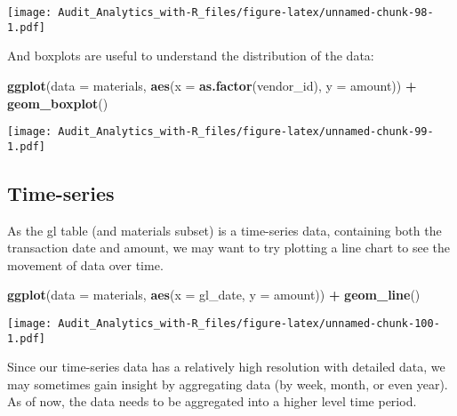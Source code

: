 \documentclass[
]{book}
\newenvironment{Shaded}{\begin{snugshade}}{\end{snugshade}}
\newcommand{\CommentTok}[1]{\textcolor[rgb]{0.56,0.35,0.01}{\textit{#1}}}
\newcommand{\DataTypeTok}[1]{\textcolor[rgb]{0.13,0.29,0.53}{#1}}
\newcommand{\KeywordTok}[1]{\textcolor[rgb]{0.13,0.29,0.53}{\textbf{#1}}}
\newcommand{\NormalTok}[1]{#1}
\newcommand{\OperatorTok}[1]{\textcolor[rgb]{0.81,0.36,0.00}{\textbf{#1}}}
\newcommand{\StringTok}[1]{\textcolor[rgb]{0.31,0.60,0.02}{#1}}
\begin{document}
\texttt{[image: Audit\_Analytics\_with-R\_files/figure-latex/unnamed-chunk-98-1.pdf]}

And boxplots are useful to understand the distribution of the data:

\begin{Shaded}
\begin{Highlighting}[]
\KeywordTok{ggplot}\NormalTok{(}\DataTypeTok{data =}\NormalTok{ materials, }\KeywordTok{aes}\NormalTok{(}\DataTypeTok{x =} \KeywordTok{as.factor}\NormalTok{(vendor_id), }\DataTypeTok{y =}\NormalTok{ amount)) }\OperatorTok{+}
\StringTok{  }\KeywordTok{geom_boxplot}\NormalTok{()}
\end{Highlighting}
\end{Shaded}

\texttt{[image: Audit\_Analytics\_with-R\_files/figure-latex/unnamed-chunk-99-1.pdf]}

\hypertarget{time-series}{%
\subsection{Time-series}\label{time-series}}

As the gl table (and materials subset) is a time-series data, containing both the transaction date and amount, we may want to try plotting a line chart to see the movement of data over time.

\begin{Shaded}
\begin{Highlighting}[]
\KeywordTok{ggplot}\NormalTok{(}\DataTypeTok{data =}\NormalTok{ materials, }\KeywordTok{aes}\NormalTok{(}\DataTypeTok{x =}\NormalTok{ gl_date, }\DataTypeTok{y =}\NormalTok{ amount)) }\OperatorTok{+}
\StringTok{  }\KeywordTok{geom_line}\NormalTok{()}
\end{Highlighting}
\end{Shaded}

\texttt{[image: Audit\_Analytics\_with-R\_files/figure-latex/unnamed-chunk-100-1.pdf]}

Since our time-series data has a relatively high resolution with detailed data, we may sometimes gain insight by aggregating data (by week, month, or even year). As of now, the data needs to be aggregated into a higher level time period.

\begin{Shaded}
\end{Shaded}
\end{document}
